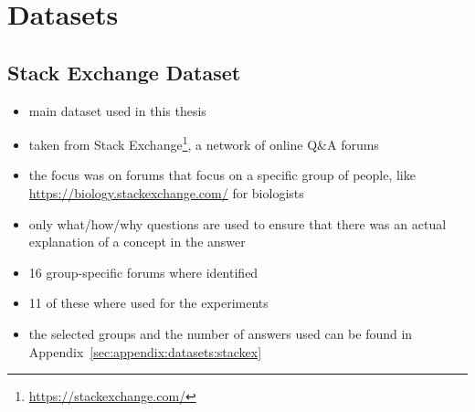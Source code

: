 \chapter{Datasets}%
\label{sec:datasets}

\section{Stack Exchange Dataset}%
\label{sec:datasets:stackex}

\begin{itemize}
  \item main dataset used in this thesis
  \item taken from Stack Exchange\footnote{\url{https://stackexchange.com/}}, a network of online Q\&A forums
  \item the focus was on forums that focus on a specific group of people, like \url{https://biology.stackexchange.com/} for biologists
  \item only what/how/why questions are used to ensure that there was an actual explanation of a concept in the answer
  \item \num{16} group-specific forums where identified
  \item \num{11} of these where used for the experiments
  \item the selected groups and the number of answers used can be found in Appendix~\ref{sec:appendix:datasets:stackex}
\end{itemize}

